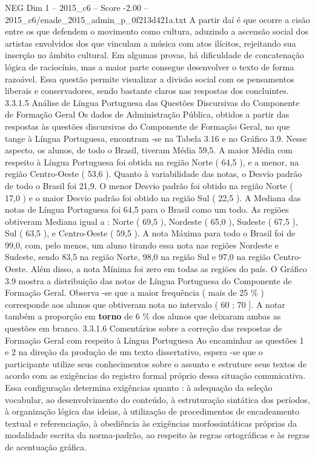 \begin{textsample}{NEG Dim 1 – 2015\_c6 – Score -2.00 – 2015\_c6/enade\_2015\_admin\_p\_0f213d421a.txt}
A partir daí é que ocorre a cisão entre os que defendem o movimento como cultura, aduzindo a ascensão social dos artistas envolvidos dos que vinculam a música com atos ilícitos, rejeitando sua inserção no âmbito cultural.
Em algumas provas, há dificuldade de concatenação lógica de raciocínio, mas a maior parte consegue desenvolver o texto de forma razoável.
Essa questão permite visualizar a divisão social com os pensamentos liberais e conservadores, sendo bastante claros nas respostas dos concluintes. 3.3.1.5 Análise de Língua Portuguesa das Questões Discursivas do Componente de Formação Geral Os dados de Administração Pública, obtidos a partir das respostas às questões discursivas do Componente de Formação Geral, no que tange à Língua Portuguesa, encontram -se na Tabela 3.16 e no Gráfico 3.9.
Nesse aspecto, os alunos, de todo o Brasil, tiveram Média 59,5.
A maior Média com respeito à Língua Portuguesa foi obtida na região Norte ( 64,5 ), e a menor, na região Centro-Oeste ( 53,6 ).
Quanto à variabilidade das notas, o Desvio padrão de todo o Brasil foi 21,9.
O menor Desvio padrão foi obtido na região Norte ( 17,0 ) e o maior Desvio padrão foi obtido na região Sul ( 22,5 ).
A Mediana das notas de Língua Portuguesa foi 64,5 para o Brasil como um todo.
As regiões obtiveram Mediana igual a : Norte ( 69,5 ), Nordeste ( 65,0 ), Sudeste ( 67,5 ), Sul ( 63,5 ), e Centro-Oeste ( 59,5 ).
A nota Máxima para todo o Brasil foi de 99,0, com, pelo menos, um aluno tirando essa nota nas regiões Nordeste e Sudeste, sendo 83,5 na região Norte, 98,0 na região Sul e 97,0 na região Centro-Oeste.
Além disso, a nota Mínima foi zero em todas as regiões do país.
O Gráfico 3.9 mostra a distribuição das notas de Língua Portuguesa do Componente de Formação Geral.
Observa -se que a maior frequência ( mais de 25 \% ) corresponde aos alunos que obtiveram nota no intervalo ( 60 ; 70 ].
A notar também a proporção em \textbf{torno} de 6 \% dos alunos que deixaram ambas as questões em branco. 3.3.1.6 Comentários sobre a correção das respostas de Formação Geral com respeito à Língua Portuguesa Ao encaminhar as questões 1 e 2 na direção da produção de um texto dissertativo, espera -se que o participante utilize seus conhecimentos sobre o assunto e estruture seus textos de acordo com as exigências do registro formal próprio dessa situação comunicativa.
Essa configuração determina exigências quanto : à adequação da seleção vocabular, ao desenvolvimento do conteúdo, à estruturação sintática dos períodos, à organização lógica das ideias, à utilização de procedimentos de encadeamento textual e referenciação, à obediência às exigências morfossintáticas próprias da modalidade escrita da norma-padrão, ao respeito às regras ortográficas e às regras de acentuação gráfica.

\end{textsample}

